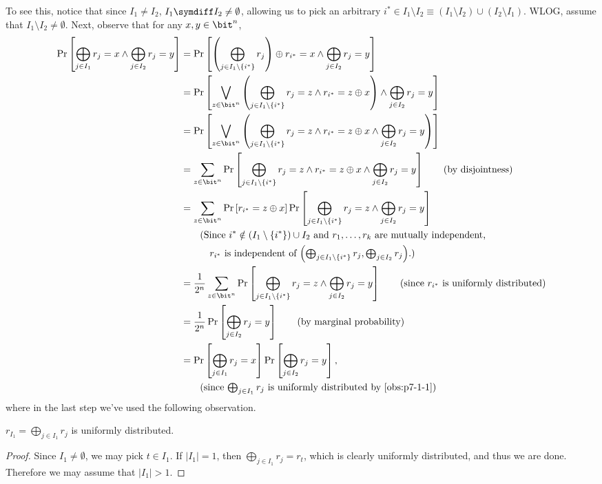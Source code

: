 \begin{answer}[i]
    To see this, notice that since $I_1\neq I_2$, $I_1\symdiff I_2  \neq \emptyset$, allowing us to pick an arbitrary $i^\ast\in I_1\setminus I_2 \equiv (I_1\setminus I_2) \cup (I_2\setminus I_1)$. WLOG, assume that $I_1\setminus I_2 \neq \emptyset$. Next, observe that for any $x,y\in\bit^n$,
    \begin{align*}
        \Pr\left[ \bigoplus_{j\in I_1} r_j = x \land \bigoplus_{j\in I_2} r_j=y \right]
        &= \Pr\left[ \left(\bigoplus_{j\in I_1\setminus \{i^\ast\}} r_j \right) \oplus r_{i^\ast} = x \land \bigoplus_{j\in I_2} r_j=y \right] \\
        &= \Pr\left[ \bigvee_{z\in\bit^n}  \left(\bigoplus_{j\in I_1\setminus \{i^\ast\}} r_j = z  \land r_{i^\ast} = z\oplus x \right) \land \bigoplus_{j\in I_2} r_j=y \right] \\
        &= \Pr\left[ \bigvee_{z\in\bit^n}  \left(\bigoplus_{j\in I_1\setminus \{i^\ast\}} r_j = z  \land r_{i^\ast} = z\oplus x  \land \bigoplus_{j\in I_2} r_j=y \right)\right] \\
        &= \sum_{z\in\bit^n} \Pr\left[ \bigoplus_{j\in I_1\setminus \{i^\ast\}} r_j = z  \land r_{i^\ast} = z\oplus x  \land \bigoplus_{j\in I_2} r_j=y \right] 
        \qquad \textrm{(by disjointness)}\\
        &= \sum_{z\in\bit^n} \Pr\left[r_{i^\ast} = z\oplus x  \right] \Pr\left[ \bigoplus_{j\in I_1\setminus \{i^\ast\}} r_j = z \land \bigoplus_{j\in I_2} r_j=y \right] \\
        &\qquad \textrm{(Since $i^\ast\notin (I_1\setminus \{i^\ast\})\cup I_2$ and $r_1,\ldots,r_k$ are mutually independent,}\\
        &\qquad\quad \textrm{$r_{i^\ast}$ is independent of $\textstyle\left(\bigoplus_{j\in I_1\setminus \{i^\ast\}} r_j, \bigoplus_{j\in I_2} r_j\right)$.)}\\
        &= \frac{1}{2^n} \sum_{z\in\bit^n}  \Pr\left[ \bigoplus_{j\in I_1\setminus \{i^\ast\}} r_j = z \land \bigoplus_{j\in I_2} r_j=y \right] 
        \qquad \textrm{(since $r_{i^\ast}$ is uniformly distributed)}\\
        &= \frac{1}{2^n} \Pr\left[ \bigoplus_{j\in I_2} r_j=y \right] 
        \qquad \textrm{(by marginal probability)}\\
        &= \Pr\left[ \bigoplus_{j\in I_1} r_j=x \right]  \Pr\left[ \bigoplus_{j\in I_2} r_j=y \right],\\
        &\qquad \textrm{(since $\textstyle \bigoplus_{j\in I_1} r_j$ is uniformly distributed by \autoref{obs:p7-1-1})}
    \end{align*}
    where in the last step we've used the following observation.
    \begin{observation}\label{obs:p7-1-1}
        $r_{I_1} = \bigoplus_{j\in I_1} r_j$ is uniformly distributed.
    \end{observation}
    \begin{proof}
        Since $I_1\neq \emptyset$, we may pick $t \in I_1$.
        If $|I_1|=1$, then $\bigoplus_{j\in I_1} r_j =r_{t}$, which is clearly uniformly distributed, and thus we are done. Therefore we may assume that $|I_1|\gt 1$.
        

\end{proof}
\end{answer}
